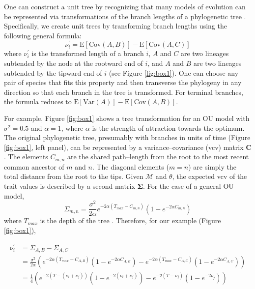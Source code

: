 \documentclass[a4paper,12pt]{article}
\begin{document}
One can construct a unit tree by recognizing that many models of evolution can be represented via transformations of the branch lengths of a phylogenetic tree \citep{Omeara2012, Ho2014}. Specifically, we create unit trees by transforming branch lengths using the following general formula:
\begin{equation}
\nu_i^\prime = \mathrm{E}[\mathrm{Cov}(A,B)] - \mathrm{E}[\mathrm{Cov}(A,C)]
\end{equation}
where $\nu_i^\prime$ is the transformed length of a branch $i$, $A$ and $C$ are two lineages subtended by the node at the rootward end of $i$, and $A$ and $B$ are two lineages subtended by the tipward end of $i$ (see Figure \ref{fig:box1}). One can choose any pair of species that fits this property and then transverse the phylogeny in any direction so that each branch in the tree is transformed. For terminal branches, the formula reduces to $\mathrm{E}[\mathrm{Var}(A)] - \mathrm{E}[\mathrm{Cov}(A,B)]$.

For example, Figure \ref{fig:box1} shows a tree transformation for an OU model with $\sigma^2=0.5$ and $\alpha = 1$, where $\alpha$ is the strength of attraction towards the optimum. The original phylogenetic tree, presumably with branches in units of time (Figure \ref{fig:box1}, left panel), can be represented by a variance--covariance (vcv) matrix $\mathbf{C}$. The elements $C_{m,n}$ are the shared path--length from the root to the most recent common ancestor of $m$ and $n$. The diagonal elements ($m = n$) are simply the total distance from the root to the tips. Given $\mathcal{M}$ and $\theta$, the expected vcv of the trait values is described by a second matrix $\mathbf{\Sigma}$. For the case of a general OU model,
\begin{equation}
\Sigma_{m,n} = \frac{\sigma^2}{2\alpha} e^{-2\alpha (T_{max} - C_{m,n})} (1 - e^{-2\alpha C_{m,n}})
\end{equation} 
where $T_{max}$ is the depth of the tree \citep{Hansen1997, ButlerKing2004}. Therefore, for our example (Figure \ref{fig:box1}), 

\begin{align*}
  \nu_i^\prime &= \Sigma_{A,B} - \Sigma_{A,C}  \\ 
&= \frac{\sigma^2}{2\alpha} \left(e^{-2\alpha (T_{max} - C_{A,B})} (1 -e^{-2\alpha C_{A,B}})
- e^{-2 \alpha (T_{max} - C_{A,C})} (1 - e^{-2\alpha C_{A,C}}) \right)  \\
&= \frac{1}{4} \left( e^{-2 (T - (\nu_i + \nu_j))} (1 - e^{-2 (\nu_i + \nu_j)})
- e^{-2 (T - \nu_j)} (1 - e^{-2 \nu_j}) \right) 
\end{align*}
\end{document}
